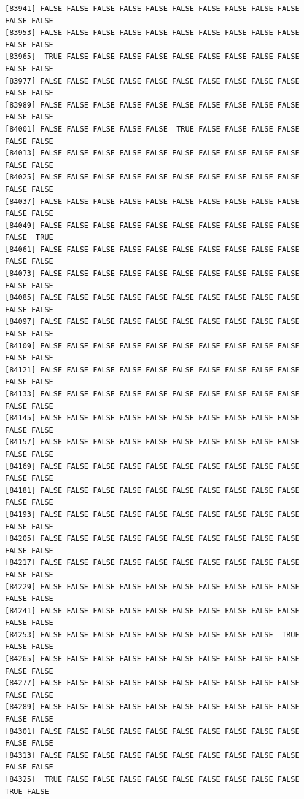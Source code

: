 \documentclass[
  a4paper,
  DIV=11,
  numbers=noendperiod]{scrartcl}
\begin{document}
\begin{verbatim}
[83941] FALSE FALSE FALSE FALSE FALSE FALSE FALSE FALSE FALSE FALSE FALSE FALSE
[83953] FALSE FALSE FALSE FALSE FALSE FALSE FALSE FALSE FALSE FALSE FALSE FALSE
[83965]  TRUE FALSE FALSE FALSE FALSE FALSE FALSE FALSE FALSE FALSE FALSE FALSE
[83977] FALSE FALSE FALSE FALSE FALSE FALSE FALSE FALSE FALSE FALSE FALSE FALSE
[83989] FALSE FALSE FALSE FALSE FALSE FALSE FALSE FALSE FALSE FALSE FALSE FALSE
[84001] FALSE FALSE FALSE FALSE FALSE  TRUE FALSE FALSE FALSE FALSE FALSE FALSE
[84013] FALSE FALSE FALSE FALSE FALSE FALSE FALSE FALSE FALSE FALSE FALSE FALSE
[84025] FALSE FALSE FALSE FALSE FALSE FALSE FALSE FALSE FALSE FALSE FALSE FALSE
[84037] FALSE FALSE FALSE FALSE FALSE FALSE FALSE FALSE FALSE FALSE FALSE FALSE
[84049] FALSE FALSE FALSE FALSE FALSE FALSE FALSE FALSE FALSE FALSE FALSE  TRUE
[84061] FALSE FALSE FALSE FALSE FALSE FALSE FALSE FALSE FALSE FALSE FALSE FALSE
[84073] FALSE FALSE FALSE FALSE FALSE FALSE FALSE FALSE FALSE FALSE FALSE FALSE
[84085] FALSE FALSE FALSE FALSE FALSE FALSE FALSE FALSE FALSE FALSE FALSE FALSE
[84097] FALSE FALSE FALSE FALSE FALSE FALSE FALSE FALSE FALSE FALSE FALSE FALSE
[84109] FALSE FALSE FALSE FALSE FALSE FALSE FALSE FALSE FALSE FALSE FALSE FALSE
[84121] FALSE FALSE FALSE FALSE FALSE FALSE FALSE FALSE FALSE FALSE FALSE FALSE
[84133] FALSE FALSE FALSE FALSE FALSE FALSE FALSE FALSE FALSE FALSE FALSE FALSE
[84145] FALSE FALSE FALSE FALSE FALSE FALSE FALSE FALSE FALSE FALSE FALSE FALSE
[84157] FALSE FALSE FALSE FALSE FALSE FALSE FALSE FALSE FALSE FALSE FALSE FALSE
[84169] FALSE FALSE FALSE FALSE FALSE FALSE FALSE FALSE FALSE FALSE FALSE FALSE
[84181] FALSE FALSE FALSE FALSE FALSE FALSE FALSE FALSE FALSE FALSE FALSE FALSE
[84193] FALSE FALSE FALSE FALSE FALSE FALSE FALSE FALSE FALSE FALSE FALSE FALSE
[84205] FALSE FALSE FALSE FALSE FALSE FALSE FALSE FALSE FALSE FALSE FALSE FALSE
[84217] FALSE FALSE FALSE FALSE FALSE FALSE FALSE FALSE FALSE FALSE FALSE FALSE
[84229] FALSE FALSE FALSE FALSE FALSE FALSE FALSE FALSE FALSE FALSE FALSE FALSE
[84241] FALSE FALSE FALSE FALSE FALSE FALSE FALSE FALSE FALSE FALSE FALSE FALSE
[84253] FALSE FALSE FALSE FALSE FALSE FALSE FALSE FALSE FALSE  TRUE FALSE FALSE
[84265] FALSE FALSE FALSE FALSE FALSE FALSE FALSE FALSE FALSE FALSE FALSE FALSE
[84277] FALSE FALSE FALSE FALSE FALSE FALSE FALSE FALSE FALSE FALSE FALSE FALSE
[84289] FALSE FALSE FALSE FALSE FALSE FALSE FALSE FALSE FALSE FALSE FALSE FALSE
[84301] FALSE FALSE FALSE FALSE FALSE FALSE FALSE FALSE FALSE FALSE FALSE FALSE
[84313] FALSE FALSE FALSE FALSE FALSE FALSE FALSE FALSE FALSE FALSE FALSE FALSE
[84325]  TRUE FALSE FALSE FALSE FALSE FALSE FALSE FALSE FALSE FALSE  TRUE FALSE

\end{verbatim}
\end{document}
